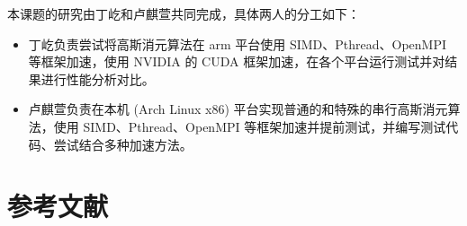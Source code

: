 \documentclass[a4paper]{article}
\begin{document}
本课题的研究由丁屹和卢麒萱共同完成，具体两人的分工如下：

\begin{itemize}
  \item 丁屹负责尝试将高斯消元算法在 arm 平台使用 SIMD、Pthread、OpenMPI 等框架加速，使用 NVIDIA 的 CUDA 框架加速，在各个平台运行测试并对结果进行性能分析对比。
  \item 卢麒萱负责在本机 (Arch Linux x86) 平台实现普通的和特殊的串行高斯消元算法，使用 SIMD、Pthread、OpenMPI 等框架加速并提前测试，并编写测试代码、尝试结合多种加速方法。
\end{itemize}

\newpage

\section{参考文献}
\cite{1}\cite{2}



\end{document}
